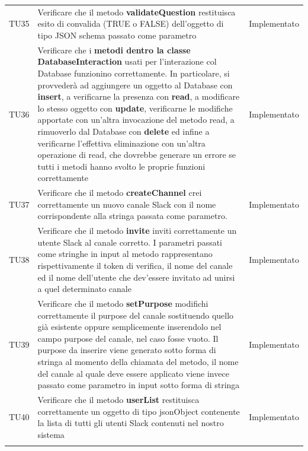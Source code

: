 \documentclass[../PianoDiQualifica_v4.0.0.tex]{subfiles}
\begin{document}
\begin{longtable}[c] { >{\centering\arraybackslash}p{2cm} p{9cm} >{\centering\arraybackslash}p{4cm}}
			\addlinespace[0.3em]
			\midrule
			\addlinespace[0.3em]
			TU35 & Verificare che il metodo \textbf{validateQuestion} restituisca esito di convalida (TRUE o FALSE) dell'oggetto di tipo JSON schema passato come parametro & Implementato \\
			\addlinespace[0.3em]
			\midrule
			\addlinespace[0.3em]
			TU36 & Verificare che i \textbf{metodi dentro la classe DatabaseInteraction} usati per l'interazione col Database funzionino correttamente. In particolare, si provvederà ad aggiungere un oggetto al Database con \textbf{insert}, a verificarne la presenza con \textbf{read}, a modificare lo stesso oggetto con \textbf{update}, verificarne le modifiche apportate con un'altra invocazione del metodo read, a rimuoverlo dal Database con \textbf{delete} ed infine a verificarne l'effettiva eliminazione con un'altra operazione di read, che dovrebbe generare un errore se tutti i metodi hanno svolto le proprie funzioni correttamente & Implementato \\
			\addlinespace[0.3em]
			\midrule
			\addlinespace[0.3em]
			TU37 & Verificare che il metodo \textbf{createChannel} crei correttamente un nuovo canale Slack con il nome corrispondente alla stringa passata come parametro. & Implementato \\
			\addlinespace[0.3em]
			\midrule
			\addlinespace[0.3em]
			TU38 & Verificare che il metodo \textbf{invite} inviti correttamente un utente Slack al canale corretto. I parametri passati come stringhe in input al metodo rappresentano rispettivamente il token di verifica, il nome del canale ed il nome dell'utente che dev'essere invitato ad unirsi a quel determinato canale & Implementato \\
			\addlinespace[0.3em]
			\midrule
			\addlinespace[0.3em]
			TU39 & Verificare che il metodo \textbf{setPurpose} modifichi correttamente il purpose del canale sostituendo quello già esistente oppure semplicemente inserendolo nel campo purpose del canale, nel caso fosse vuoto. Il purpose da inserire viene generato sotto forma di stringa al momento della chiamata del metodo, il nome del canale al quale deve essere applicato viene invece passato come parametro in input sotto forma di stringa & Implementato \\
			\addlinespace[0.3em]
			\midrule
			\addlinespace[0.3em]
			TU40 & Verificare che il metodo \textbf{userList} restituisca correttamente un oggetto di tipo jsonObject contenente la lista di tutti gli utenti Slack contenuti nel nostro sistema & Implementato \\
			\addlinespace[0.3em]

\end{longtable}
\end{document}
